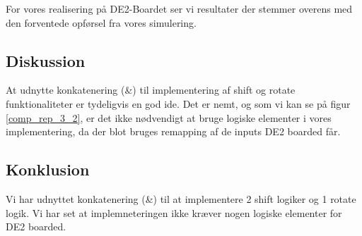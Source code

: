 \documentclass[../journal2.tex]{subfiles}
\begin{document}
For vores realisering på DE2-Boardet ser vi resultater der stemmer overens med den forventede opførsel fra vores simulering.



\subsection{Diskussion}

At udnytte konkatenering (\&) til implementering af shift og rotate funktionaliteter er tydeligvis en god ide. Det er nemt, og som vi kan se på figur \ref{comp_rep_3_2}, er det ikke nødvendigt at bruge logiske elementer i vores implementering, da der blot bruges remapping af de inputs DE2 boarded får.


\subsection{Konklusion}

Vi har udnyttet konkatenering (\&) til at implementere 2 shift logiker og 1 rotate logik. Vi har set at implemneteringen ikke kræver nogen logiske elementer for DE2 boarded.
\end{document}
